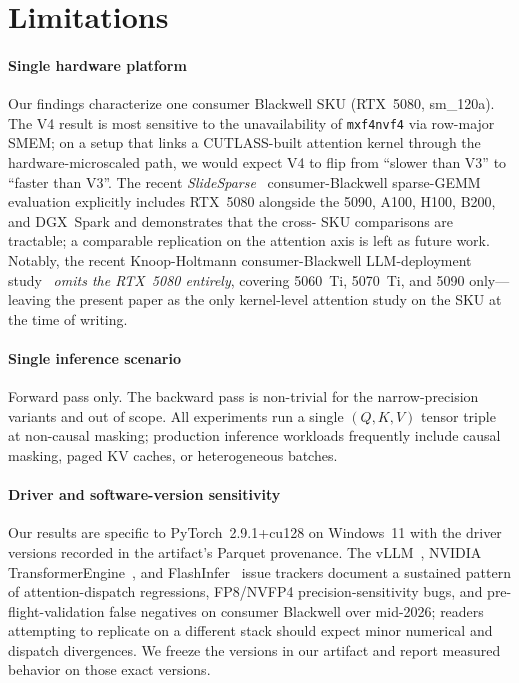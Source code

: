 \documentclass[conference]{IEEEtran}
\begin{document}
\section{Limitations}
\label{sec:limits}

\paragraph*{Single hardware platform} Our findings characterize one
consumer Blackwell SKU (RTX~5080, sm\_120a). The V4 result is most
sensitive to the unavailability of \texttt{mxf4nvf4} via row-major
SMEM; on a setup that links a CUTLASS-built attention kernel through
the hardware-microscaled path, we would expect V4 to flip from
``slower than V3'' to ``faster than V3''. The recent
\emph{SlideSparse}~\cite{shao2026slidesparse} consumer-Blackwell
sparse-GEMM evaluation explicitly includes RTX~5080 alongside the
5090, A100, H100, B200, and DGX~Spark and demonstrates that the cross-
SKU comparisons are tractable; a comparable replication on the
attention axis is left as future work. Notably, the recent
Knoop-Holtmann consumer-Blackwell LLM-deployment
study~\cite{knoop2026consumerllm} \emph{omits the RTX~5080 entirely},
covering 5060~Ti, 5070~Ti, and 5090 only---leaving the present paper
as the only kernel-level attention study on the SKU at the time of
writing.

\paragraph*{Single inference scenario} Forward pass only. The backward
pass is non-trivial for the narrow-precision variants and out of scope.
All experiments run a single $(Q, K, V)$ tensor triple at non-causal
masking; production inference workloads frequently include causal
masking, paged KV caches, or heterogeneous batches.

\paragraph*{Driver and software-version sensitivity} Our results are
specific to PyTorch~2.9.1+cu128 on Windows~11 with the driver versions
recorded in the artifact's Parquet provenance. The
vLLM~\cite{vllm2025issue14452,vllm2025issue29030,vllm2025issue30707},
NVIDIA TransformerEngine~\cite{te2025issue2186}, and
FlashInfer~\cite{vllm2026issue35138} issue trackers document a
sustained pattern of attention-dispatch regressions, FP8/NVFP4
precision-sensitivity bugs, and pre-flight-validation false negatives
on consumer Blackwell over mid-2026; readers attempting to replicate
on a different stack should expect minor numerical and dispatch
divergences. We freeze the versions in our artifact and report
measured behavior on those exact versions.
\end{document}
